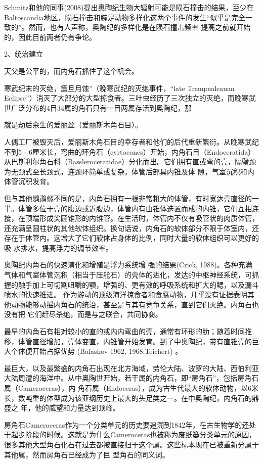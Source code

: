 \documentclass{article}
\begin{document}
Schmitz和他的同事(2008)提出奥陶纪生物大辐射可能是陨石撞击的结果，至少在Baltoscandia地区，陨石撞击和腕足动物多样化这两个事件的发生“似乎是完全一致的”。然而，也有人声称，奥陶纪的多样化是在陨石撞击频率
提高之前就开始的，因此目前两者仍有争论。 


2、统治建立 


天父是公平的，而内角石抓住了这个机会。 

寒武纪末的灭绝，震旦月蚀”（晚寒武纪的灭绝事件，“late Trempealeauan Eclipse”）消灭了大部分的大型掠食者。三叶虫经历了三次独立的灭绝，而晚寒武世广泛分布的4目34属的角石只有一目两属存活到奥陶纪，那

\newpage
就是劫后余生的爱丽丝（爱丽斯木角石目）。 

人偶工厂被毁灭后，爱丽斯木角石目的幸存者和他们的后代重新繁衍。从晚寒武纪不到5 - 6厘米长，弯曲的环角石（cyrtocones）开始，内角石目（Endoceratida）从巴斯利尔角石科（Bassleroceratidae）分化而出。它们拥有直或弯的壳，隔璧颈为无颈式至长颈式，连颈环简单或复杂，体管后部具内锥及体
隙，气室沉积和内体管沉积发育。 

但与其他鹦鹉螺不同的是，内角石拥有一根非常粗大的体管，有时宽达壳直径的一半。体管多位于壳的腹边或近腹边，体管内有由锥体迭置而成的内锥，它们互相连接，在顶端形成尖圆锥形的内锥管。在生活时，体管内不仅有吸管状的肉质体管，还充满呈圆柱状的其他软体组织。换句话说，内角石的软体部分不限于体室内，还存在于体管内。这增大了它们软体占身体的比例，同时大量的软体组织可以更好的吸
水排水，提高浮力的调节效率。 

奥陶纪内角石的快速演化和增殖是浮力系统增
\newpage
强的结果(Crick, 1988)。各种充满气体和气室体管沉积（相当于压舱石）的壳体的进化，发达的中枢神经系统，可抓握的触手加上可切割咀嚼的颚，增强的、更有效的呼吸系统和扩大的鳃，以及漏斗喷水的快速推进。
作为游动的顶级海洋掠食者和食腐动物，几乎没有证据表明其他动物能够动摇内角石的统治，甚至是与其有竞争关系，直到它们灭绝。内角石也没有把
它们赶尽杀绝，而是与之联合，共同协商。 

最早的内角石有相对较小的直的或内内弯曲的壳，通常有环形的肋；随着时间推移，体管直径增加，壳体变直，内锥管开始发育。到了中奥陶纪，带有直锥壳的巨大个体便开始占据优势 (Balashov 1962, 1968;Teichert)
。 

最巨大，以及最繁盛的内角石出现在北方海域，劳伦大陆、波罗的大陆、西伯利亚大陆周遭的海洋中。从中奥陶世开始，若干属的内角石，即“房角石”，包括房角石属（Cameroceras），内
\newpage
角石属（Endoceras），成为古生代最大的软体动物，以6米长，数吨重的体型成为该亚纲历史上最大的头足类之一。在中奥陶纪，内角石的鼎盛之
年，他的威望和力量达到顶峰。 

房角石Cameroceras作为一个分类单元的历史要追溯到1842年，在古生物学的还处于起步阶段的时候。这就是为什么Cameroceras也被称为废纸篓分类单元的原因，很多其他大型角石化石在过去都被直接归于这个属。这些标本现在已被重新分属于其他属，然而房角石已经成为了巨
型角石的同义词。 
\end{document}
